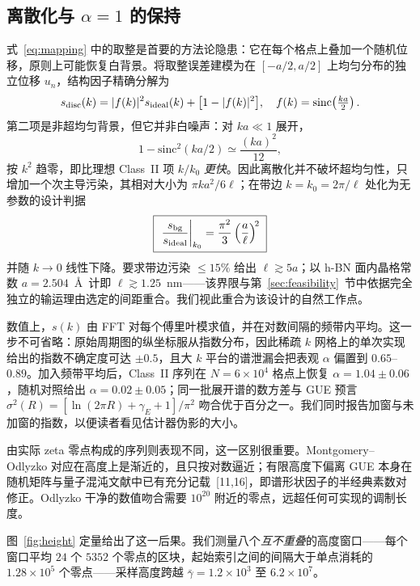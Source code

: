 \documentclass[10pt,twocolumn]{article}
\newcommand{\kzero}{k_{0}}
\begin{document}
\subsection{离散化与 $\alpha=1$ 的保持}
\label{sec:discretization}

式~\eqref{eq:mapping} 中的取整是首要的方法论隐患：它在每个格点上叠加一个随机位移，原则上可能恢复白背景。将取整误差建模为在 $[-a/2,a/2]$ 上均匀分布的独立位移 $u_n$，结构因子精确分解为
\begin{equation}
  s_{\rm disc}(k)=|f(k)|^{2}s_{\rm ideal}(k)+\big[1-|f(k)|^{2}\big],
  \quad f(k)=\mathrm{sinc}\!\left(\tfrac{ka}{2}\right).
  \label{eq:decomp}
\end{equation}
第二项是非超均匀背景，但它并非白噪声：对 $ka\ll1$ 展开，
\begin{equation}
  1-\mathrm{sinc}^{2}(ka/2)\simeq\frac{(ka)^{2}}{12},
  \label{eq:bgexp}
\end{equation}
按 $k^{2}$ 趋零，即比理想 Class~II 项 $k/\kzero$ \emph{更快}。因此离散化并不破坏超均匀性，只增加一个次主导污染，其相对大小为 $\pi k a^{2}/6\ell$；在带边 $k=\kzero=2\pi/\ell$ 处化为无参数的设计判据
\begin{equation}
  \boxed{\;
  \left.\frac{s_{\rm bg}}{s_{\rm ideal}}\right|_{\kzero}
    = \frac{\pi^{2}}{3}\left(\frac{a}{\ell}\right)^{\!2}\;}
  \label{eq:designrule}
\end{equation}
并随 $k\to0$ 线性下降。要求带边污染 $\le15\%$ 给出 $\ell\gtrsim5a$；以 h-BN 面内晶格常数 $a=2.504$~\AA\ 计即 $\ell\gtrsim1.25$~nm——该界限与第~\ref{sec:feasibility}~节中依据完全独立的输运理由选定的间距重合。我们视此重合为该设计的自然工作点。

数值上，$s(k)$ 由 FFT 对每个傅里叶模求值，并在对数间隔的频带内平均。这一步不可省略：原始周期图的纵坐标服从指数分布，因此稀疏 $k$ 网格上的单次实现给出的指数不确定度可达 $\pm0.5$，且大 $k$ 平台的谱泄漏会把表观 $\alpha$ 偏置到 $0.65$--$0.89$。加入频带平均后，Class~II 序列在 $N=6\times10^{4}$ 格点上恢复 $\alpha=1.04\pm0.06$，随机对照给出 $\alpha=0.02\pm0.05$；同一批展开谱的数方差与 GUE 预言 $\sigma^{2}(R)=[\ln(2\pi R)+\gamma_E+1]/\pi^{2}$ 吻合优于百分之一。我们同时报告加窗与未加窗的指数，以便读者看见估计器伪影的大小。

由实际 zeta 零点构成的序列则表现不同，这一区别很重要。Montgomery--Odlyzko 对应在高度上是渐近的，且只按对数逼近；有限高度下偏离 GUE 本身在随机矩阵与量子混沌文献中已有充分记载~[11,16]，即谱形状因子的半经典素数对修正。Odlyzko 干净的数值吻合需要 $10^{20}$ 附近的零点，远超任何可实现的调制长度。

图~\ref{fig:height} 定量给出了这一后果。我们测量八个\emph{互不重叠}的高度窗口——每个窗口平均 $24$ 个 $5352$ 个零点的区块，起始索引之间的间隔大于单点消耗的 $1.28\times10^{5}$ 个零点——采样高度跨越 $\bar\gamma=1.2\times10^{3}$ 至 $6.2\times10^{7}$。
\end{document}
